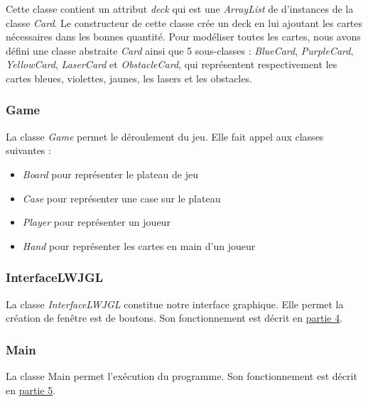 \documentclass{article}
\begin{document}
Cette classe contient un attribut \textit{deck} qui est une \textit{ArrayList} de d'instances de la classe \textit{Card}. Le constructeur de cette classe crée un deck en lui ajoutant les cartes nécessaires dans les bonnes quantité. Pour modéliser toutes les cartes, nous avons défini une classe abstraite \textit{Card} ainsi que 5 sous-classes :  \textit{BlueCard}, \textit{PurpleCard}, \textit{YellowCard}, \textit{LaserCard} et \textit{ObstacleCard}, qui représentent respectivement les cartes bleues, violettes, jaunes, les lasers et les obstacles.  

		\subsubsection{Game}
\indent La classe \textit{Game} permet le déroulement du jeu. Elle fait appel aux classes suivantes :
			\begin{itemize}
  				\item \textit{Board} pour représenter le plateau de jeu
  				\item \textit{Case} pour représenter une case sur le plateau
				\item \textit{Player} pour représenter un joueur
				\item \textit{Hand} pour représenter les cartes en main d'un joueur 
			\end{itemize}
			
		\subsubsection{InterfaceLWJGL}
\indent		La classe \textit{InterfaceLWJGL} constitue notre interface graphique. Elle permet la création de fenêtre est de boutons. Son fonctionnement est décrit en \hyperref[sec:interfaceGraphique]{partie 4}.
		
		\subsubsection{Main}
\indent		La classe Main permet l'exécution du programme. Son fonctionnement est décrit en \hyperref[sec:game]{partie 5}.
		
\end{document}
